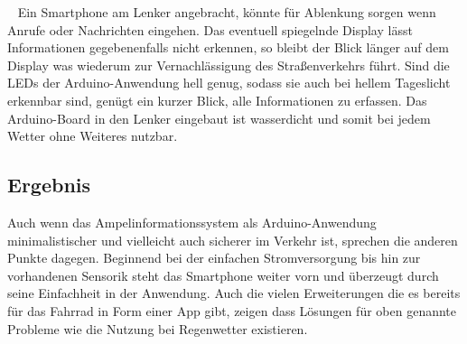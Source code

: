\begin{description}[leftmargin=0.7cm,style=nextline]
  \item[Verkehrssicherheit] ~ Ein \gls{Smartphone} am Lenker angebracht, könnte für Ablenkung sorgen wenn Anrufe oder Nachrichten eingehen. Das eventuell spiegelnde Display lässt Informationen gegebenenfalls nicht erkennen, so bleibt der Blick länger auf dem Display was wiederum zur Vernachlässigung des Straßenverkehrs führt. Sind die \glspl{LED} der \gls{Arduino}-Anwendung hell genug, sodass sie auch bei hellem Tageslicht erkennbar sind, genügt ein kurzer Blick, alle Informationen zu erfassen. Das \gls{Arduino}-Board in den Lenker eingebaut ist wasserdicht und somit bei jedem Wetter ohne Weiteres nutzbar.\\ 
\end{description}
\subsection*{Ergebnis}  
Auch wenn das Ampelinformationssystem als \gls{Arduino}-Anwendung minimalistischer und vielleicht auch sicherer im Verkehr ist, sprechen die anderen Punkte dagegen. Beginnend bei der einfachen Stromversorgung bis hin zur vorhandenen Sensorik steht das \gls{Smartphone} weiter vorn und überzeugt durch seine Einfachheit in der Anwendung. Auch die vielen Erweiterungen die es bereits für das Fahrrad in Form einer App gibt, zeigen dass Lösungen für oben genannte Probleme wie die Nutzung bei Regenwetter existieren. 
